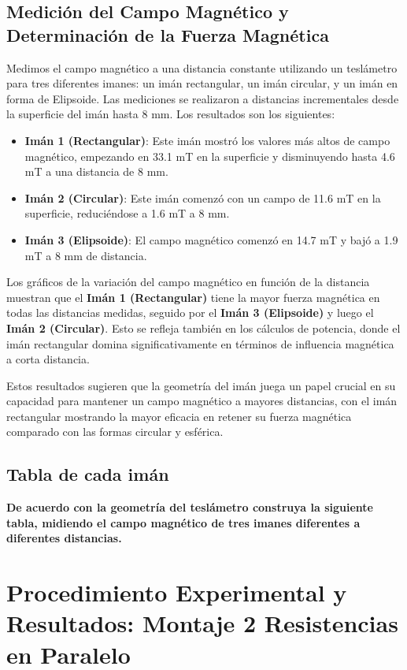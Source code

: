 \subsection{Medición del Campo Magnético y Determinación de la Fuerza Magnética}
Medimos el campo magnético a una distancia constante utilizando un teslámetro para tres diferentes imanes: un imán rectangular, un imán circular, y un imán en forma de Elipsoide. Las mediciones se realizaron a distancias incrementales desde la superficie del imán hasta 8 mm. Los resultados son los siguientes:

\begin{itemize}
    \item \textbf{Imán 1 (Rectangular)}: Este imán mostró los valores más altos de campo magnético, empezando en 33.1 mT en la superficie y disminuyendo hasta 4.6 mT a una distancia de 8 mm.
    \item \textbf{Imán 2 (Circular)}: Este imán comenzó con un campo de 11.6 mT en la superficie, reduciéndose a 1.6 mT a 8 mm.
    \item \textbf{Imán 3 (Elipsoide)}: El campo magnético comenzó en 14.7 mT y bajó a 1.9 mT a 8 mm de distancia.
\end{itemize}

Los gráficos de la variación del campo magnético en función de la distancia muestran que el \textbf{Imán 1 (Rectangular)} tiene la mayor fuerza magnética en todas las distancias medidas, seguido por el \textbf{Imán 3 (Elipsoide)} y luego el \textbf{Imán 2 (Circular)}. Esto se refleja también en los cálculos de potencia, donde el imán rectangular domina significativamente en términos de influencia magnética a corta distancia.

Estos resultados sugieren que la geometría del imán juega un papel crucial en su capacidad para mantener un campo magnético a mayores distancias, con el imán rectangular mostrando la mayor eficacia en retener su fuerza magnética comparado con las formas circular y esférica.

\subsection{Tabla de cada imán}
\textbf{De acuerdo con la geometría del teslámetro construya la siguiente tabla, midiendo
el campo magnético de tres imanes diferentes a diferentes distancias.}


\section{Procedimiento Experimental y Resultados: Montaje 2 Resistencias en Paralelo}

